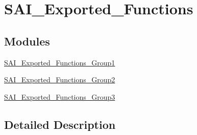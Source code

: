 \hypertarget{group___s_a_i___exported___functions}{}\section{S\+A\+I\+\_\+\+Exported\+\_\+\+Functions}
\label{group___s_a_i___exported___functions}
\subsection*{Modules}
\begin{DoxyCompactItemize}
\item 
\hyperlink{group___s_a_i___exported___functions___group1}{S\+A\+I\+\_\+\+Exported\+\_\+\+Functions\+\_\+\+Group1}
\item 
\hyperlink{group___s_a_i___exported___functions___group2}{S\+A\+I\+\_\+\+Exported\+\_\+\+Functions\+\_\+\+Group2}
\item 
\hyperlink{group___s_a_i___exported___functions___group3}{S\+A\+I\+\_\+\+Exported\+\_\+\+Functions\+\_\+\+Group3}
\end{DoxyCompactItemize}


\subsection{Detailed Description}
